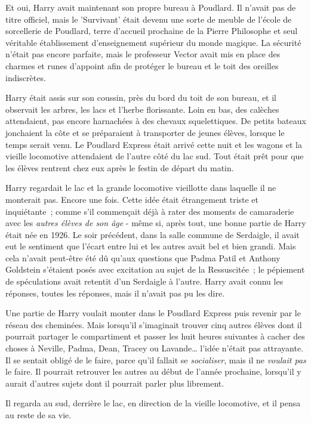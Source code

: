Et oui, Harry avait maintenant son propre bureau à Poudlard. Il n'avait pas de titre officiel, mais le 'Survivant' était devenu une sorte de meuble de l'école de sorcellerie de Poudlard, terre d'accueil prochaine de la Pierre Philosophe et seul véritable établissement d'enseignement supérieur du monde magique. La sécurité n'était pas encore parfaite, mais le professeur Vector avait mis en place des charmes et runes d'appoint afin de protéger le bureau et le toit des oreilles indiscrètes.

Harry était assis sur son coussin, près du bord du toit de son bureau, et il observait les arbres, les lacs et l'herbe florissante. Loin en bas, des calèches attendaient, pas encore harnachées à des chevaux squelettiques. De petits bateaux jonchaient la côte et se préparaient à transporter de jeunes élèves, lorsque le temps serait venu. Le Poudlard Express était arrivé cette nuit et les wagons et la vieille locomotive attendaient de l'autre côté du lac sud. Tout était prêt pour que les élèves rentrent chez eux après le festin de départ du matin.

Harry regardait le lac et la grande locomotive vieillotte dans laquelle il ne monterait pas. Encore une fois. Cette idée était étrangement triste et inquiétante~; comme s'il commençait déjà à rater des moments de camaraderie avec les \emph{autres élèves de son âge} - même si, après tout, une bonne partie de Harry était née en 1926. Le soir précédent, dans la salle commune de Serdaigle, il avait eut le sentiment que l'écart entre lui et les autres avait bel et bien grandi. Mais cela n'avait peut-être été dû qu'aux questions que Padma Patil et Anthony Goldstein s'étaient posés avec excitation au sujet de la Ressuscitée~; le pépiement de spéculations avait retentit d'un Serdaigle à l'autre. Harry avait connu les réponses, toutes les réponses, mais il n'avait pas pu les dire.

Une partie de Harry voulait monter dans le Poudlard Express puis revenir par le réseau des cheminées. Mais lorsqu'il s'imaginait trouver cinq autres élèves dont il pourrait partager le compartiment et passer les huit heures suivantes à cacher des choses à Neville, Padma, Dean, Tracey ou Lavande… l'idée n'était pas attrayante. Il se sentait obligé de le faire, parce qu'il fallait se \emph{socialiser}, mais il ne \emph{voulait pas} le faire. Il pourrait retrouver les autres au début de l'année prochaine, lorsqu'il y aurait d'autres sujets dont il pourrait parler plus librement.

Il regarda au sud, derrière le lac, en direction de la vieille locomotive, et il pensa au reste de sa vie.

